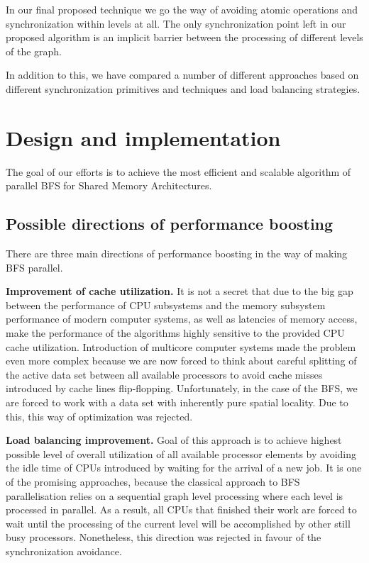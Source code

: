 \documentclass[letterpaper]{article}
\begin{document}
		In our final proposed technique we go the way of avoiding atomic operations and synchronization within levels at all.
		The only synchronization point left in our proposed algorithm is an implicit barrier between the processing of different levels of the graph.
		
		In addition to this, we have compared a number of different approaches based on different synchronization primitives and techniques and load balancing strategies.

	
	
	\section{Design and implementation}\label{sec:deim} %
		The goal of our efforts is to achieve the most efficient and scalable algorithm of parallel BFS for Shared Memory Architectures. 

		\subsection{Possible directions of performance boosting}
			There are three main directions of performance boosting in the way of making BFS parallel.
			
			\textbf{Improvement of cache utilization.}
			It is not a secret that due to the big gap between the performance of CPU subsystems and the memory subsystem performance of modern computer systems, as well as latencies of memory access, make the performance of the algorithms highly sensitive to the provided CPU cache utilization. 
			Introduction of multicore computer systems made the problem even more complex because  we are now forced to think about careful splitting of the active data set between all available processors to avoid cache misses introduced by cache lines flip-flopping. 
			Unfortunately, in the case of the BFS, we are forced to work with a data set with inherently pure spatial locality. 
			Due to this, this way of optimization was rejected.
			
			\textbf{Load balancing improvement.} 
			Goal of this approach is to achieve highest possible level of overall utilization of all available processor elements by avoiding the idle time of CPUs introduced by waiting for the arrival of a new job.
			It is one of the promising approaches, because the classical approach to BFS parallelisation relies on a sequential graph level processing where each level is processed in parallel.
			As a result, all CPUs that finished their work are forced to wait until the processing of the current level will be accomplished by other still busy processors.
			Nonetheless, this direction was rejected in favour of the synchronization avoidance. 
			
\end{document}
